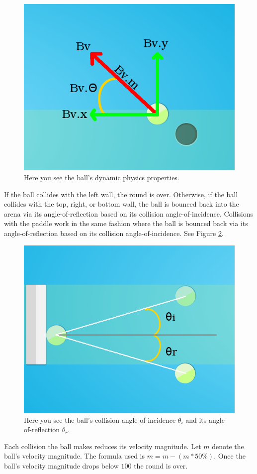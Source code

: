 \documentclass[a4paper,10pt]{article}
\begin{document}
\begin{figure}[H]  
  \centering
  \includegraphics[width=.7\textwidth]{figures/ball.png}
  \caption{Here you see the ball's dynamic physics properties.}
  \label{fig:ball}
\end{figure}

If the ball collides with the left wall, the round is over. Otherwise, if the ball collides with the top, right, or bottom wall, the ball is bounced back into the arena via its angle-of-reflection based on its collision angle-of-incidence. Collisions with the paddle work in the same fashion where the ball is bounced back via its angle-of-reflection based on its collision angle-of-incidence. See Figure \ref{fig:angle}.

\begin{figure}[H]  
  \centering
  \includegraphics[width=.5\textwidth]{figures/angle.png}
  \caption{Here you see the ball's collision angle-of-incidence $\theta_i$ and its angle-of-reflection $\theta_r$.}
  \label{fig:angle}
\end{figure}

Each collision the ball makes reduces its velocity magnitude. Let $m$ denote the ball's velocity magnitude. The formula used is $m = m - (m * 50\%)$. Once the ball's velocity magnitude drops below $100$ the round is over.
\end{document}
